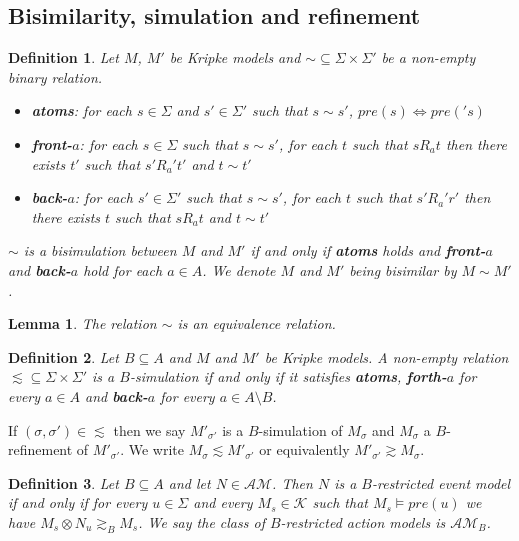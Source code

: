\documentclass[12pt, a4paper, titlepage]{scrartcl}
\newtheorem{defn}{Definition}[subsection]
\newtheorem{lemma}{Lemma}[subsection]
\numberwithin{equation}{section}
\newcommand{\kripkeClass}{\mathcal{K}}
\newcommand{\eventClass}{\mathcal{AM}}
\newcommand{\FIXME}{{\bf FIXME}}
\begin{document}
\subsection{Bisimilarity, simulation and refinement}

\begin{defn} \label{bisimKripke}
	Let $M$, $M'$ be Kripke models and $\sim \subseteq \Sigma \times \Sigma'$ be a non-empty binary
	relation.
	\begin{itemize}
		\item {\bf atoms}: for each $s \in \Sigma$ and $s' \in \Sigma'$ such that $s \sim s'$, $pre(s)
		\iff pre('s)$
		\item {\bf front-$a$}: for each $s \in \Sigma$ such that $s \sim s'$, for each $t$ such that
		$s R_a t$ then there exists $t'$ such that $s' R_a' t'$ and $t \sim t'$
		\item {\bf back-$a$}: for each $s' \in \Sigma'$ such that $s \sim s'$, for each $t$ such that
		$s' R_a' r'$ then there exists $t$ such that $s R_a t$ and $t \sim t'$
	\end{itemize}
	$\sim$ is a bisimulation between $M$ and $M'$ if and only if {\bf atoms} holds and {\bf front-$a$}
	and {\bf back-$a$} hold for each $a \in A$.
	We denote $M$ and $M'$ being bisimilar by $M \sim M'$.
\end{defn}

\begin{lemma} \label{bisimEquivalence}
	The relation $\sim$ is an equivalence relation.
\end{lemma}

\begin{defn} \label{refinement}
Let $B \subseteq A$ and $M$ and $M'$ be Kripke models. A non-empty relation $\lesssim \subseteq \Sigma
\times \Sigma'$ is a $B$-simulation if and only if it satisfies {\bf atoms}, {\bf forth-$a$} for
every $a \in A$ and {\bf back-$a$} for every $a \in A \setminus B$.
\end{defn}
If $(\sigma, \sigma') \in \lesssim$ then we say $M'_{\sigma'}$ is a $B$-simulation of $M_\sigma$ and
$M_\sigma$ a $B$-refinement of $M'_{\sigma'}$.
We write $M_{\sigma} \lesssim M'_{\sigma'}$ or equivalently $M'_{\sigma'} \gtrsim M_{\sigma}$.

\begin{defn} \label{brestrict}
Let $B \subseteq A$ and let $N \in \eventClass$. Then $N$ is a $B$-restricted event model if and
only if for every $u \in \Sigma$ and every $M_s \in \kripkeClass$ such that $M_s \models pre(u)$ we
have $M_s \otimes N_u \gtrsim_B M_s$.
We say the class of $B$-restricted action models is $\eventClass_B$.
\end{defn}
\end{document}

